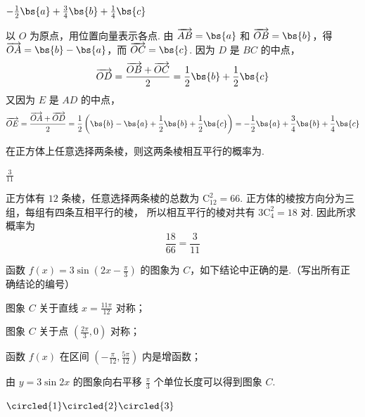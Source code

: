 \begin{answer}
\(-\frac12\bs{a}+\frac34\bs{b}+\frac14\bs{c}\)
\end{answer}

\begin{solution}
以 \(O\) 为原点，用位置向量表示各点. 由 \(\overrightarrow{AB}=\bs{a}\) 和
\(\overrightarrow{OB}=\bs{b}\)，得 \(\overrightarrow{OA}=\bs{b}-\bs{a}\)，而
\(\overrightarrow{OC}=\bs{c}\). 因为 \(D\) 是 \(BC\) 的中点，
\[
\overrightarrow{OD}=\frac{\overrightarrow{OB}+\overrightarrow{OC}}2
=\frac12\bs{b}+\frac12\bs{c}
\]
又因为 \(E\) 是 \(AD\) 的中点，
\[
\overrightarrow{OE}=\frac{\overrightarrow{OA}+\overrightarrow{OD}}2
=\frac12\left(\bs{b}-\bs{a}+\frac12\bs{b}+\frac12\bs{c}\right)
=-\frac12\bs{a}+\frac34\bs{b}+\frac14\bs{c}
\]
\end{solution}

\begin{problem}
在正方体上任意选择两条棱，则这两条棱相互平行的概率为\fillinblank{}.
\end{problem}

\begin{answer}
\(\frac3{11}\)
\end{answer}

\begin{solution}
正方体有 \(12\) 条棱，任意选择两条棱的总数为
\(\mathrm C_{12}^{2}=66\). 正方体的棱按方向分为三组，每组有四条互相平行的棱，
所以相互平行的棱对共有
\(3\mathrm C_{4}^{2}=18\) 对. 因此所求概率为
\[
\frac{18}{66}=\frac3{11}
\]
\end{solution}

\begin{problem}
函数 \( f(x)=3\sin\left(2x-\frac{\pi}{3}\right) \) 的图象为 \(C\)，如下结论中正确的是\fillinblank{}.（写出所有正确结论的编号）

\begin{circlelist}
\item 图象 \(C\) 关于直线 \( x = \frac{11\pi}{12} \) 对称；
\item 图象 \(C\) 关于点 \( \left(\frac{2\pi}{3},0\right) \) 对称；
\item 函数 \( f(x) \) 在区间 \( \left(-\frac{\pi}{12}, \frac{5\pi}{12}\right) \) 内是增函数；
\item 由 \(y = 3\sin 2x\) 的图象向右平移 \(\frac{\pi}{3}\) 个单位长度可以得到图象 \(C\).
\end{circlelist}
\end{problem}

\begin{answer}
\(\circled{1}\circled{2}\circled{3}\)
\end{answer}

